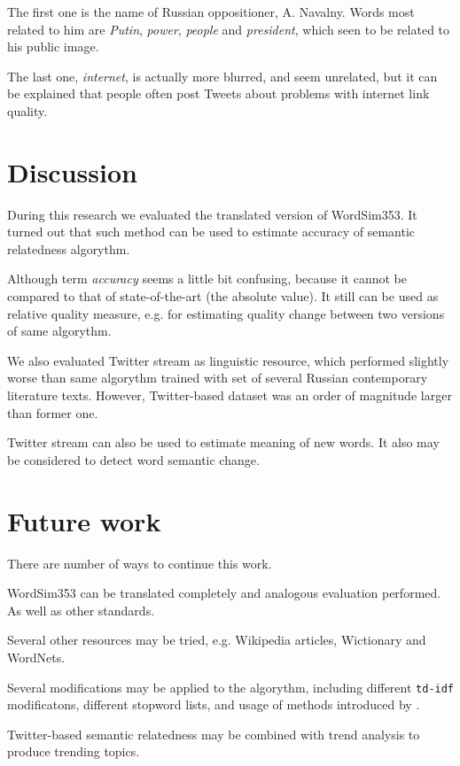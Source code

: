 \documentclass[11pt,letterpaper]{article}
\begin{document}
The first one is the name of Russian oppositioner, A. Navalny. Words most related to him
are {\em Putin}, {\em power}, {\em people} and {\em president}, which seen to be related
to his public image.

The last one, {\em internet}, is actually more blurred, and seem unrelated, but it can
be explained that people often post Tweets about problems with internet link quality.

\section{Discussion}

During this research we evaluated the translated version of WordSim353.
It turned out that such method can be used to estimate accuracy
of semantic relatedness algorythm. 

Although term {\em accuracy} seems a little bit confusing, because it cannot 
be compared to that of state-of-the-art (the absolute value). 
It still can be used as relative
quality measure, e.g. for estimating quality change between two versions
of same algorythm.

We also evaluated Twitter stream as linguistic resource, which performed
slightly worse than same algorythm trained with set of several Russian contemporary
literature texts. However, Twitter-based dataset was an order of magnitude larger
than former one. 

Twitter stream can also be used to estimate meaning of new words.
It also may be considered to detect word semantic change.

\section{Future work}

There are number of ways to continue this work.

WordSim353 can be translated completely and analogous evaluation performed.
As well as other standards.

Several other resources may be tried, e.g. Wikipedia articles, Wictionary and 
WordNets.

Several modifications may be applied to the algorythm, including different
{\tt td-idf} modificatons, different stopword lists, and usage of methods
introduced by \cite{mikolov2013efficient}.  

Twitter-based semantic relatedness may be combined with trend analysis to
produce trending topics.
\end{document}
